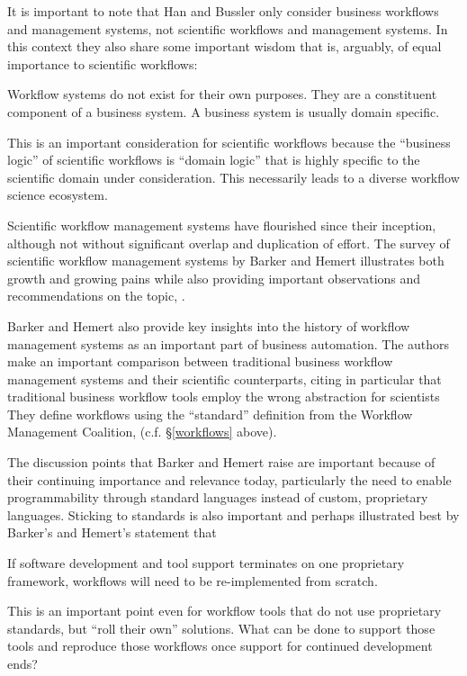 It is important to note that Han and Bussler only consider business
workflows and management systems, not scientific workflows and
management systems. In this context they also share some important
wisdom that is, arguably, of equal importance to scientific workflows:

\begin{displayquote}
Workflow systems do not exist for their own purposes. They
are a constituent component of a business system. A business system is usually domain
specific.
\end{displayquote}

This is an important consideration for scientific workflows because the
``business logic'' of scientific workflows is ``domain logic'' that is
highly specific to the scientific domain under consideration. This
necessarily leads to a diverse workflow science ecosystem.

Scientific workflow management systems have flourished since their
inception, although not without significant overlap and duplication of
effort. The survey of scientific workflow management systems by Barker
and Hemert illustrates both growth and growing pains while also providing
important observations and recommendations on the topic,
\cite{barker_scientific_2007}.

Barker and Hemert also provide key insights into the history of
workflow management systems as an important part of business
automation. The authors make an important comparison between traditional
business workflow management systems and their scientific counterparts,
citing in particular that traditional business workflow tools employ the
wrong abstraction for scientists They define workflows using the
``standard'' definition from the Workflow Management Coalition, (c.f. \S \ref{workflows} above).

The discussion points that Barker and Hemert raise are important because
of their continuing importance and relevance today, particularly the
need to enable programmability through standard languages instead of
custom, proprietary languages. Sticking to
standards is also important and perhaps illustrated best by Barker's and
Hemert's statement that

\begin{displayquote}
If software development and tool support terminates on one proprietary 
framework, workflows will need to be re-implemented from scratch.
\end{displayquote}

This is an important point even for workflow tools that do not use
proprietary standards, but ``roll their own'' solutions. What can be
done to support those tools and reproduce those workflows once support
for continued development ends?

